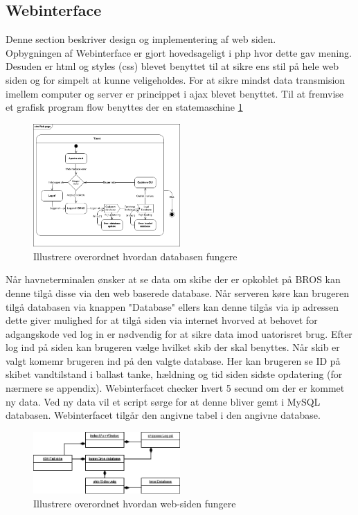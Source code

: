 \subsection{Webinterface}
Denne section beskriver design og implementering af web siden.\\
Opbygningen af Webinterface er gjort hovedsageligt i php hvor dette gav mening. Desuden er html og styles (css) blevet benyttet til at sikre ens stil på hele web siden og for simpelt at kunne veligeholdes. For at sikre mindst data transmision imellem computer og server er princippet i ajax blevet benyttet.
Til at fremvise et grafisk program flow benyttes der en statemaschine \ref{fig:stm_web}
 
\begin{figure}[H]
\centering
\includegraphics[width = 0.5\textwidth]{billeder/Systemarkitektur/stm_web}
\caption{Illustrere overordnet hvordan databasen fungere}
\label{fig:stm_web}
\end{figure}

Når havneterminalen ønsker at se data om skibe der er opkoblet på BROS kan denne tilgå disse via den web baserede database. Når serveren køre kan brugeren tilgå databasen via knappen "Database" ellers kan denne tilgås via ip adressen dette giver mulighed for at tilgå siden via internet hvorved at behovet for adgangskode ved log in er nødvendig for at sikre data imod uatorisret brug. Efter log ind på siden kan brugeren vælge hvilket skib der skal benyttes. Når skib er valgt komemr brugeren ind på den valgte database. Her kan brugeren se ID på skibet vandtilstand i ballast tanke, hældning og tid siden sidste opdatering (for nærmere se appendix). Webinterfacet checker hvert 5 secund om der er kommet ny data. Ved ny data vil et script sørge for at denne bliver gemt i MySQL databasen. Webinterfacet tilgår den angivne tabel i den angivne database.

\begin{figure}[H]
\centering
\includegraphics[width = 0.5\textwidth]{billeder/database_web}
\caption{Illustrere overordnet hvordan web-siden fungere}
\label{fig:database_web}
\end{figure}

